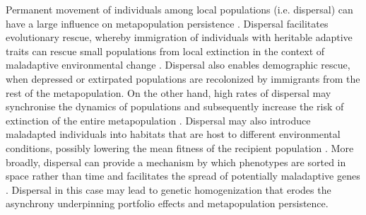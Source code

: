 \documentclass{revtex4}
\begin{document}
Permanent movement of individuals among local populations (i.e. dispersal) can have a large influence on metapopulation persistence \citep{MilnerGulland:2011vm}. 
Dispersal facilitates evolutionary rescue, whereby immigration of individuals with heritable adaptive traits can rescue small populations from local extinction in the context of maladaptive environmental change \citep{Bell:2011ki,Carlson:2014is}.
Dispersal also enables demographic rescue, when depressed or extirpated populations are recolonized by immigrants from the rest of the metapopulation.
On the other hand, high rates of dispersal may synchronise the dynamics of populations and subsequently increase the risk of extinction of the entire metapopulation \citep{Earn:2000fm,Satterthwaite:2015ge}. 
Dispersal may also introduce maladapted individuals into habitats that are host to different environmental conditions, possibly lowering the mean fitness of the recipient population \citep{Ronce:2001dp,Muhlfeld:2014hs}. 
More broadly, dispersal can provide a mechanism by which phenotypes are sorted in space rather than time and facilitates the spread of potentially maladaptive genes \citep{Lowe:2015ft}.
Dispersal in this case may lead to genetic homogenization that erodes the asynchrony underpinning portfolio effects and metapopulation persistence. 
\end{document}
